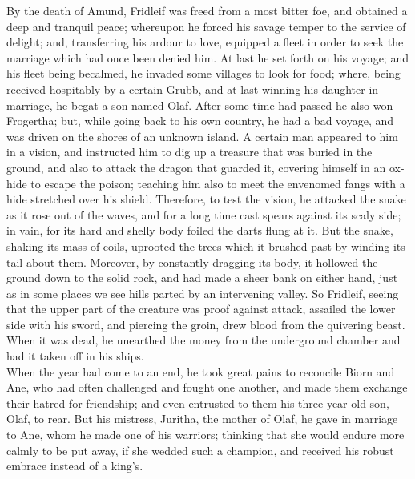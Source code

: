 \documentclass[10pt,a4paper]{report}
\begin{document}
By the death of Amund, Fridleif was freed from a most bitter foe, and obtained a deep and tranquil peace; whereupon he forced his savage temper to the service of delight; and, transferring his ardour to love, equipped a fleet in order to seek the marriage which had once been denied him. At last he set forth on his voyage; and his fleet being becalmed, he invaded some villages to look for food; where, being received hospitably by a certain Grubb, and at last winning his daughter in marriage, he begat a son named Olaf. After some time had passed he also won Frogertha; but, while going back to his own country, he had a bad voyage, and was driven on the shores of an unknown island. A certain man appeared to him in a vision, and instructed him to dig up a treasure that was buried in the ground, and also to attack the dragon that guarded it, covering himself in an ox-hide to escape the poison; teaching him also to meet the envenomed fangs with a hide stretched over his shield. Therefore, to test the vision, he attacked the snake as it rose out of the waves, and for a long time cast spears against its scaly side; in vain, for its hard and shelly body foiled the darts flung at it. But the snake, shaking its mass of coils, uprooted the trees which it brushed past by winding its tail about them. Moreover, by constantly dragging its body, it hollowed the ground down to the solid rock, and had made a sheer bank on either hand, just as in some places we see hills parted by an intervening valley. So Fridleif, seeing that the upper part of the creature was proof against attack, assailed the lower side with his sword, and piercing the groin, drew blood from the quivering beast. When it was dead, he unearthed the money from the underground chamber and had it taken off in his ships.\\

When the year had come to an end, he took great pains to reconcile Biorn and Ane, who had often challenged and fought one another, and made them exchange their hatred for friendship; and even entrusted to them his three-year-old son, Olaf, to rear. But his mistress, Juritha, the mother of Olaf, he gave in marriage to Ane, whom he made one of his warriors; thinking that she would endure more calmly to be put away, if she wedded such a champion, and received his robust embrace instead of a king's.\\
\end{document}
